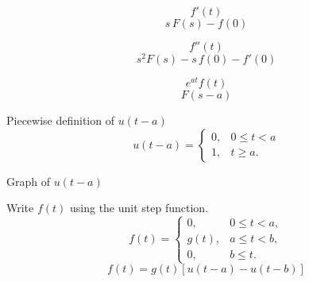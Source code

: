 \documentclass[grid, custom]{flashcards}      %
\begin{document}

  \begin{flashcard}{ \[ f'(t) \] }
    \[
      s \, F(s)-f(0)
    \]
  \end{flashcard}

  \begin{flashcard}{ \[ f''(t) \] }
    \[
      s^{2} F(s) -s\,f(0) - f'(0)
    \]
  \end{flashcard}



  \begin{flashcard}{ \[ e^{at} f(t) \] }
    \[
      F(s-a)
    \]
  \end{flashcard}

  \begin{flashcard}{Piecewise definition of $ u(t - a) $}
    \[
      u(t - a) = 
      \begin{cases}
        0, & 0 \leq t < a \\
        1, & t \geq a.
      \end{cases}
    \]
  \end{flashcard}

  \begin{flashcard}{Graph of $ u(t - a) $}
  \end{flashcard}

  \begin{flashcard}{Write $f(t)$ using the unit step function.
    \[ f(t) =
       \begin{cases}
          0,    & 0 \leq t < a, \\
          g(t), & a \leq t < b, \\
          0,    & b \leq t.
        \end{cases}
    \]
    }
    \[
      f(t) = g(t) \left[ u(t-a) - u(t-b) \right]
    \]
  \end{flashcard}

\end{document}

